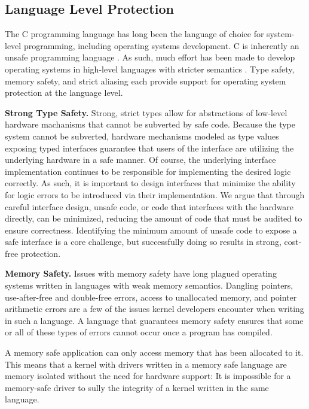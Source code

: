 \subsection{Language Level Protection}

The C programming language has long been the language of choice for system-level
programming, including operating systems development. C is inherently an unsafe
programming language \cite{kint:osdi2012, undefined:apsys2012}. As such, much
effort has been made to develop operating systems in high-level languages with
stricter semantics \cite{singularity:sigops, house:icfp2005, unikernels:2013}.
Type safety, memory safety, and strict aliasing each provide support for
operating system protection at the language level.

\textbf{Strong Type Safety.}
Strong, strict types allow for abstractions of low-level hardware machanisms
that cannot be subverted by safe code. Because the type system cannot be
subverted, hardware mechanisms modeled as type values exposing typed interfaces
guarantee that users of the interface are utilizing the underlying hardware in a
safe manner. Of course, the underlying interface implementation continues to be
responsible for implementing the desired logic correctly. As such, it is
important to design interfaces that minimize the ability for logic errors to be
introduced via their implementation. We argue that through careful interface
design, unsafe code, or code that interfaces with the hardware directly, can be
minimized, reducing the amount of code that must be audited to ensure
correctness. Identifying the minimum amount of unsafe code to expose a safe
interface is a core challenge, but successfully doing so results in strong,
cost-free protection.

\textbf{Memory Safety.}
Issues with memory safety have long plagued operating systems written in
languages with weak memory semantics. Dangling pointers, use-after-free and
double-free errors, access to unallocated memory, and pointer arithmetic errors
are a few of the issues kernel developers encounter when writing in such a
language. A language that guarantees memory safety ensures that some or all of
these types of errors cannot occur once a program has compiled.

A memory safe application can only access memory that has been allocated to it.
This means that a kernel with drivers written in a memory safe language are
memory isolated without the need for hardware support: It is impossible for a
memory-safe driver to sully the integrity of a kernel written in the same
language.

